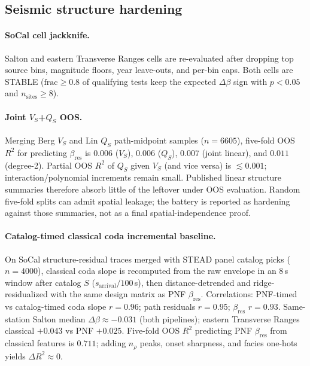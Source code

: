 \documentclass[twocolumn, 10pt]{article}
\begin{document}
\subsection*{Seismic structure hardening}

\paragraph{SoCal cell jackknife.}
Salton and eastern Transverse Ranges cells are re-evaluated after dropping top source bins, magnitude floors, year leave-outs, and per-bin caps. Both cells are STABLE (\(\mathrm{frac}\ge0.8\) of qualifying tests keep the expected \(\Delta\beta\) sign with \(p<0.05\) and \(n_{\mathrm{sites}}\ge8\)).

\paragraph{Joint \(V_S\)+\(Q_S\) OOS.}
Merging Berg \(V_S\) and Lin \(Q_S\) path-midpoint samples (\(n=6605\)), five-fold OOS \(R^{2}\) for predicting \(\beta_{\mathrm{res}}\) is \(0.006\) (\(V_S\)), \(0.006\) (\(Q_S\)), \(0.007\) (joint linear), and \(0.011\) (degree-2). Partial OOS \(R^{2}\) of \(Q_S\) given \(V_S\) (and vice versa) is \(\lesssim0.001\); interaction/polynomial increments remain small. Published linear structure summaries therefore absorb little of the leftover under OOS evaluation. Random five-fold splits can admit spatial leakage; the battery is reported as hardening against those summaries, not as a final spatial-independence proof.

\paragraph{Catalog-timed classical coda incremental baseline.}
On SoCal structure-residual traces merged with STEAD panel catalog picks (\(n=4000\)), classical coda slope is recomputed from the raw envelope in an 8\,s window after catalog \(S\) (\(s_{\mathrm{arrival}}/100\)\,s), then distance-detrended and ridge-residualized with the same design matrix as PNF \(\beta_{\mathrm{res}}\). Correlations: PNF-timed vs catalog-timed coda slope \(r=0.96\); path residuals \(r=0.95\); \(\beta_{\mathrm{res}}\) \(r=0.93\). Same-station Salton median \(\Delta\beta\approx-0.031\) (both pipelines); eastern Transverse Ranges classical \(+0.043\) vs PNF \(+0.025\). Five-fold OOS \(R^{2}\) predicting PNF \(\beta_{\mathrm{res}}\) from classical features is \(0.711\); adding \(n_{\rho}\) peaks, onset sharpness, and facies one-hots yields \(\Delta R^{2}\approx0\).
\end{document}
